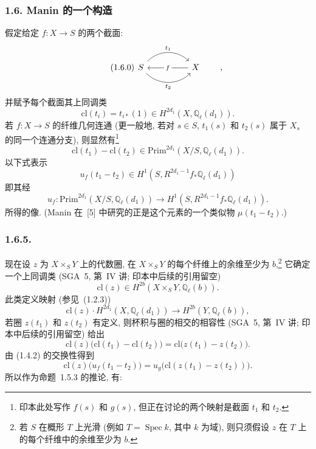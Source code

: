 \subsubsection*{1.6. Manin 的一个构造}
假定给定 $f:X\longrightarrow S$ 的两个截面:
\begin{equation}\tag{1.6.0}
\begin{tikzcd}[column sep=huge]
S \arrow[r, bend left=45, "t_1"]
  \arrow[r, bend right=45, "t_2"']
& X \arrow[l, "f" description]
\end{tikzcd}
\qquad ,
\end{equation}
并赋予每个截面其上同调类
\begin{equation}\tag{1.6.1}
\mathrm{cl}(t_i)=t_{i*}(1)
\in H^{2d_1}(X,\mathbb Q_\ell(d_1)).
\end{equation}
若 $f:X\longrightarrow S$ 的纤维几何连通 (更一般地, 若对 $s\in S$, $t_1(s)$ 和 $t_2(s)$ 属于 $X_s$ 的同一个连通分支), 则显然有\footnote{印本此处写作 $f(s)$ 和 $g(s)$, 但正在讨论的两个映射是截面 $t_1$ 和 $t_2$.}
\begin{equation}\tag{1.6.2}
\mathrm{cl}(t_1)-\mathrm{cl}(t_2)
\in\mathrm{Prim}^{2d_1}(X/S,\mathbb Q_\ell(d_1)).
\end{equation}
以下式表示
\begin{equation}\tag{1.6.3}
u_f(t_1-t_2)\in
H^1(S,R^{2d_1-1}f_*\mathbb Q_\ell(d_1))
\end{equation}
即其经
\begin{equation}\tag{1.6.4}
u_f:\mathrm{Prim}^{2d_1}(X/S,\mathbb Q_\ell(d_1))
\longrightarrow H^1(S,R^{2d_1-1}f_*\mathbb Q_\ell(d_1)).
\end{equation}
所得的像.
(Manin 在~[5] 中研究的正是这个元素的一个类似物 $\mu(t_1-t_2)$.)

\subsubsection*{1.6.5.}
现在设 $z$ 为 $X\times_S Y$ 上的代数圈, 在 $X\times_S Y$ 的每个纤维上的余维至少为 $b$,\footnote{若 $S$ 在概形 $T$ 上光滑 (例如 $T=\operatorname{Spec}k$, 其中 $k$ 为域), 则只须假设 $z$ 在 $T$ 上的每个纤维中的余维至少为 $b$.} 它确定一个上同调类 (SGA~5, 第~IV 讲; 印本中后续的引用留空)
\begin{equation}\tag{1.6.6}
\mathrm{cl}(z)\in H^{2b}(X\times_S Y,\mathbb Q_\ell(b)).
\end{equation}
此类定义映射 (参见~(1.2.3))
\begin{equation}\tag{1.6.7}
\mathrm{cl}(z)\mathbin{\cdot}H^{2d_1}(X,\mathbb Q_\ell(d_1))
\longrightarrow H^{2b}(Y,\mathbb Q_\ell(b)),
\end{equation}
若圈 $z(t_1)$ 和 $z(t_2)$ 有定义, 则杯积与圈的相交的相容性 (SGA~5, 第~IV 讲; 印本中后续的引用留空) 给出
\begin{equation}\tag{1.6.8}
\mathrm{cl}(z)\bigl(\mathrm{cl}(t_1)-\mathrm{cl}(t_2)\bigr)
=\mathrm{cl}\bigl(z(t_1)-z(t_2)\bigr).
\end{equation}
由 (1.4.2) 的交换性得到
\begin{equation}\tag{1.6.9}
\mathrm{cl}(z)\bigl(u_f(t_1-t_2)\bigr)
=u_g\bigl(\mathrm{cl}(z(t_1)-z(t_2))\bigr).
\end{equation}
所以作为命题~1.5.3 的推论, 有:

